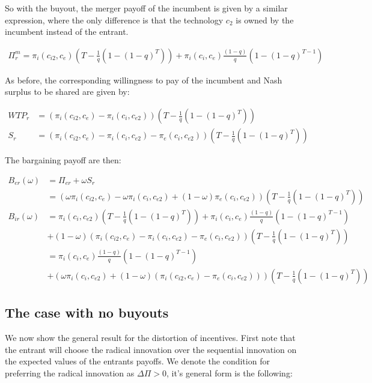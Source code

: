 So with the buyout, the merger payoff of the incumbent is given by a similar expression, where the only difference is that the technology $c_2$ is owned by the incumbent instead of the entrant. 

\begin{align*}
\Pi^m_r = \pi_{i}(c_{i2},c_{e}) \left( T - \frac{1}{q} \left( 1-(1-q)^{T} \right) \right)
+\pi_i(c_i,c_e) \frac{(1-q)}{q} \left( 1-(1-q)^{T-1} \right)
\end{align*}

As before, the corresponding willingness to pay of the incumbent and Nash surplus to be shared are given by: 

\begin{align*}
WTP_r &= (\pi_{i}(c_{i2},c_{e})-\pi_{i}(c_{i},c_{e2})) \left( T- \frac{1}{q} \left( 1-(1-q)^{T} \right) \right) \\
S_r &= (\pi_{i}(c_{i2},c_{e})-\pi_{i}(c_{i},c_{e2})-\pi_{e}(c_{i},c_{e2})) \left( T - \frac{1}{q} \left( 1-(1-q)^{T} \right) \right)
\end{align*}

The bargaining payoff are then:

\begin{align*}
B_{er}(\omega) &= \Pi_{er}+\omega S_r \\
&= \left(\omega\pi_{i}(c_{i2},c_{e})-\omega \pi_{i}(c_{i},c_{e2})+(1-\omega)\pi_{e}(c_{i},c_{e2}) \right) \left( T - \frac{1}{q} \left( 1-(1-q)^{T} \right) \right) \\
B_{ir}(\omega) &=\pi_{i}(c_i,c_{e2}) \left( T - \frac{1}{q} \left( 1-(1-q)^{T} \right) \right)
+\pi_i(c_i,c_e) \frac{(1-q)}{q} \left( 1-(1-q)^{T-1} \right)
\\ &+(1-\omega)(\pi_{i}(c_{i2},c_{e})-\pi_{i}(c_{i},c_{e2})-\pi_{e}(c_{i},c_{e2})) \left( T- \frac{1}{q} \left( 1-(1-q)^{T} \right) \right) \\
&=\pi_i(c_i,c_e) \frac{(1-q)}{q} \left( 1-(1-q)^{T-1} \right)
\\ &+(\omega \pi_i(c_i,c_{e2})+(1-\omega)(\pi_{i}(c_{i2},c_{e})-\pi_{e}(c_{i},c_{e2}))) \left( T - \frac{1}{q} \left( 1-(1-q)^{T} \right) \right)
\end{align*}

\subsection{The case with no buyouts}

We now show the general result for the distortion of incentives. First note that the entrant will choose the radical innovation over the sequential innovation on the expected values of the entrants payoffs. We denote the condition for preferring the radical innovation as $\Delta \Pi >0$, it's general form is the following: 

